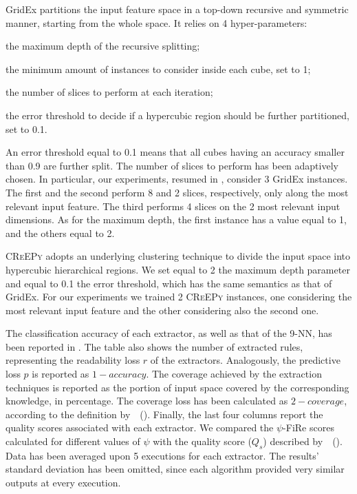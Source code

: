 \documentclass{article}
\newcommand{\citet}[1]{\citeauthor{#1}~(\citeyear{#1})}
\newcommand{\gridex}{GridEx}
\newcommand{\creepy}{\textsc{CReEPy}}
\newcommand{\fire}{FiRe}
\newcommand{\psifire}{$\psi$-\fire}
\newenvironment{inlinelist}{\begin{enumerate*}[label=\emph{(\roman{*})}]}{\end{enumerate*}}
\begin{document}
\gridex{} partitions the input feature space in a top-down recursive and symmetric manner, starting from the whole space.
%
It relies on 4 hyper-parameters:
%
\begin{inlinelist}
	\item the maximum depth of the recursive splitting;
	\item the minimum amount of instances to consider inside each cube, set to 1;
	\item the number of slices to perform at each iteration;
	\item the error threshold to decide if a hypercubic region should be further partitioned, set to 0.1.
\end{inlinelist}
%
An error threshold equal to 0.1 means that all cubes having an accuracy smaller than 0.9 are further split.
%
The number of slices to perform has been adaptively chosen.
%
In particular, our experiments, resumed in , consider 3 \gridex{} instances.
%
The first and the second perform 8 and 2 slices, respectively, only along the most relevant input feature.
%
The third performs 4 slices on the 2 most relevant input dimensions.
%
As for the maximum depth, the first instance has a value equal to 1, and the others equal to 2.

\creepy{} adopts an underlying clustering technique to divide the input space into hypercubic hierarchical regions.
%
We set equal to 2 the maximum depth parameter and equal to 0.1 the error threshold, which has the same semantics as that of \gridex{}.
%
For our experiments we trained 2 \creepy{} instances, one considering the most relevant input feature and the other considering also the second one.

The classification accuracy of each extractor, as well as that of the 9-NN, has been reported in .
%
The table also shows the number of extracted rules, representing the readability loss $r$ of the extractors.
%
Analogously, the predictive loss $p$ is reported as $1-accuracy$.
%
The coverage achieved by the extraction techniques is reported as the portion of input space covered by the corresponding knowledge, in percentage.
%
The coverage loss has been calculated as $2-coverage$, according to the definition by~\citet{skemetrics-aaai2023}.
%
Finally, the last four columns report the quality scores associated with each extractor.
%
We compared the \psifire{} scores calculated for different values of $\psi$ with the quality score ($Q_s$) described by~\citet{skemetrics-aaai2023}.
%
Data has been averaged upon 5 executions for each extractor.
%
The results' standard deviation has been omitted, since each algorithm provided very similar outputs at every execution.
\end{document}
